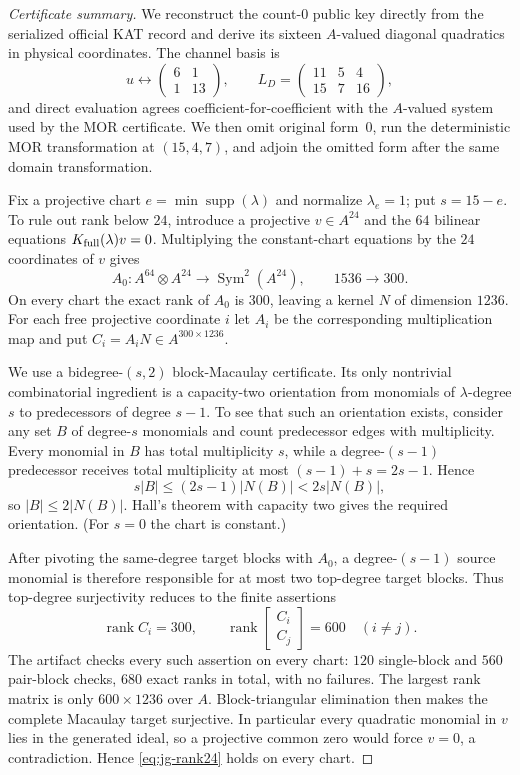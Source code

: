 \documentclass[11pt]{article}
\newcommand{\rank}{\operatorname{rank}}
\begin{document}
\begin{proof}[Certificate summary]
We reconstruct the count-$0$ public key directly from the serialized official
KAT record and derive its sixteen $A$-valued diagonal quadratics in physical
coordinates.  The channel basis is
\[
 u\longleftrightarrow
 \begin{pmatrix}6&1\\1&13\end{pmatrix},\qquad
 L_D=\begin{pmatrix}11&5&4\\15&7&16\end{pmatrix},
\]
and direct evaluation agrees coefficient-for-coefficient with the
$A$-valued system used by the MOR certificate.  We then omit original form~0,
run the deterministic MOR transformation at $(15,4,7)$, and adjoin the
omitted form after the same domain transformation.

Fix a projective chart
$e=\min\operatorname{supp}(\lambda)$ and normalize $\lambda_e=1$; put
$s=15-e$.  To rule out rank below $24$, introduce a projective
$v\in A^{24}$ and the $64$ bilinear equations
$K_{\rm full}(\lambda)v=0$.  Multiplying the constant-chart equations by the
$24$ coordinates of $v$ gives
\[
 A_0:A^{64}\otimes A^{24}\longrightarrow \operatorname{Sym}^2(A^{24}),
 \qquad 1536\longrightarrow300.
\]
On every chart the exact rank of $A_0$ is $300$, leaving a kernel $N$ of
dimension $1236$.  For each free projective coordinate $i$ let
$A_i$ be the corresponding multiplication map and put
$C_i=A_iN\in A^{300\times1236}$.

We use a bidegree-$(s,2)$ block-Macaulay certificate.  Its only nontrivial
combinatorial ingredient is a capacity-two orientation from monomials of
$\lambda$-degree $s$ to predecessors of degree $s-1$.  To see that such an
orientation exists, consider any set $B$ of degree-$s$ monomials and count
predecessor edges with multiplicity.  Every monomial in $B$ has total
multiplicity $s$, while a degree-$(s-1)$ predecessor receives total
multiplicity at most $(s-1)+s=2s-1$.  Hence
\[
   s|B|\le(2s-1)|N(B)|<2s|N(B)|,
\]
so $|B|\le2|N(B)|$.  Hall's theorem with capacity two gives the required
orientation.  (For $s=0$ the chart is constant.)

After pivoting the same-degree target blocks with $A_0$, a degree-$(s-1)$
source monomial is therefore responsible for at most two top-degree target
blocks.  Thus top-degree surjectivity reduces to the finite assertions
\[
 \rank C_i=300,
 \qquad
 \rank\!\begin{bmatrix}C_i\\C_j\end{bmatrix}=600
 \quad(i\ne j).
\]
The artifact checks every such assertion on every chart: $120$ single-block
and $560$ pair-block checks, $680$ exact ranks in total, with no failures.
The largest rank matrix is only $600\times1236$ over $A$.  Block-triangular
elimination then makes the complete Macaulay target surjective.  In
particular every quadratic monomial in $v$ lies in the generated ideal, so a
projective common zero would force $v=0$, a contradiction.  Hence
\eqref{eq:jg-rank24} holds on every chart.
\end{proof}
\end{document}
